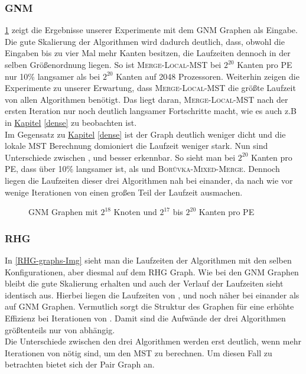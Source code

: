 \subsubsection{GNM}
\cref{GNM-graphs-Img} zeigt die Ergebnisse unserer Experimente mit dem GNM Graphen als Eingabe. \\
Die gute Skalierung der Algorithmen wird dadurch deutlich, dass, obwohl die Eingaben bis zu vier Mal mehr Kanten besitzen, die Laufzeiten dennoch in der selben Größenordnung liegen. So ist \textsc{Merge-Local-MST} bei $2^{20}$ Kanten pro PE nur 10\% langsamer als bei $2^{20}$ Kanten auf 2048 Prozessoren. Weiterhin zeigen die Experimente zu unserer Erwartung, dass \textsc{Merge-Local-MST} die größte Laufzeit von allen Algorithmen benötigt. Das liegt daran, \textsc{Merge-Local-MST} nach der ersten Iteration nur noch deutlich langsamer Fortschritte macht, wie es auch z.B in \hyperref[dense]{Kapitel} \ref{dense} zu beobachten ist.\\
Im Gegensatz zu \hyperref[dense]{Kapitel} \ref{dense} ist der Graph deutlich weniger dicht
und die lokale MST Berechnung domioniert die Laufzeit weniger stark.
Nun sind Unterschiede zwischen \boruvkaAllreduce, \boruvkaThenMerge und \boruvkaMixedMerge besser erkennbar. So sieht man bei $2^{20}$ Kanten pro PE, dass \boruvkaAllreduce über 10\% langsamer ist, als \boruvkaThenMerge und \textsc{Bor{\r u}vka-Mixed-Merge}. Dennoch liegen die Laufzeiten dieser drei Algorithmen nah bei einander, da nach wie vor wenige Iterationen von \boruvkaAllreduce einen großen Teil der Laufzeit ausmachen.
\newpage

\begin{figure}[H]
    \centering
    
    

    
    
    \caption{GNM Graphen mit $2^{18}$ Knoten und $2^{17}$ bis $2^{20}$ Kanten pro PE}
    \label{GNM-graphs-Img}
\end{figure}


\subsubsection{RHG}
In \cref{RHG-graphs-Img} sieht man die Laufzeiten der Algorithmen mit den selben Konfigurationen, aber diesmal auf dem RHG Graph. Wie bei den GNM Graphen bleibt die gute Skalierung erhalten und auch der Verlauf der Laufzeiten sieht identisch aus. Hierbei liegen die Laufzeiten von \boruvkaAllreduceNoSpace, \boruvkaThenMerge und \boruvkaMixedMerge noch näher bei einander als auf GNM Graphen. Vermutlich sorgt die Struktur des Graphen für eine erhöhte Effizienz bei Iterationen von \boruvkaAllreduceNoSpace. Damit sind die Aufwände der drei Algorithmen größtenteils nur von \boruvkaAllreduce abhängig. \\
Die Unterschiede zwischen den drei Algorithmen werden erst deutlich, wenn mehr Iterationen von \boruvkaAllreduce nötig sind, um den MST zu berechnen. Um diesen Fall zu betrachten bietet sich der Pair Graph an.

